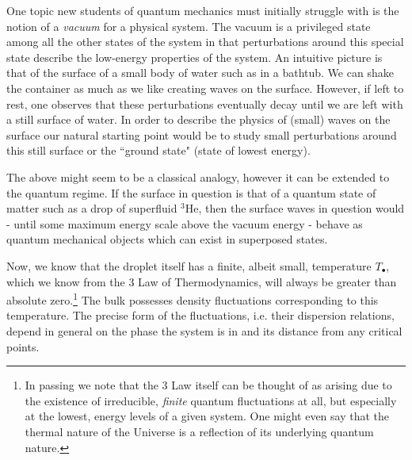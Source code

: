 \begin{doublespace}
One topic new students of quantum mechanics must initially struggle with is the notion of a \emph{vacuum} for a physical system. The vacuum is a privileged state among all the other states of the system in that perturbations around this special state describe the low-energy properties of the system. An intuitive picture is that of the surface of a small body of water such as in a bathtub. We can shake the container as much as we like creating waves on the surface. However, if left to rest, one observes that these perturbations eventually decay until we are left with a still surface of water. In order to describe the physics of (small) waves on the surface our natural starting point would be to study small perturbations around this still surface or the ``ground state" (state of lowest energy).

The above might seem to be a classical analogy, however it can be extended to the quantum regime. If the surface in question is that of a quantum state of matter such as a drop of superfluid $ {}^3 $He, then the surface waves in question would - until some maximum energy scale above the vacuum energy - behave as quantum mechanical objects which can exist in superposed states.

Now, we know that the droplet itself has a finite, albeit small, temperature $ T_{\bullet} $, which we know from the 3 Law of Thermodynamics, will always be greater than absolute zero.\footnote{In passing we note that the 3 Law itself can be thought of as arising due to the existence of irreducible, \emph{finite} quantum fluctuations at all, but especially at the lowest, energy levels of a given system. One might even say that the thermal nature of the Universe is a reflection of its underlying quantum nature.} The bulk possesses density fluctuations corresponding to this temperature. The precise form of the fluctuations, i.e. their dispersion relations, depend in general on the phase the system is in and its distance from any critical points.



\end{doublespace}
